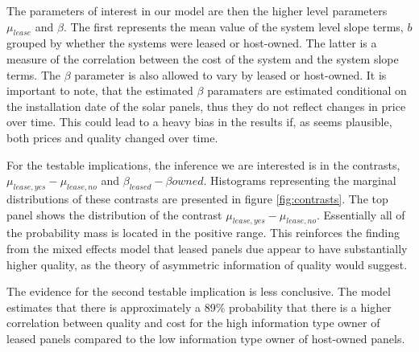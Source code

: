 \documentclass[12pt]{article}
\begin{document}
The parameters of interest in our model are then the higher level parameters $\mu_{lease}$ and $\beta$. The first represents the mean value of the system level slope terms, $b$ grouped by whether the systems were leased or host-owned. The latter is a measure of the correlation between the cost of the system and the system slope terms. The $\beta$ parameter is also allowed to vary by leased or host-owned. It is important to note, that the estimated $\beta$ paramaters are estimated conditional on the installation date of the solar panels, thus they do not reflect changes in price over time. This could lead to a heavy bias in the results if, as seems plausible, both prices and quality changed over time.

For the testable implications, the inference we are interested is in the contrasts, $\mu_{lease, yes} - \mu_{lease, no}$ and $\beta_{leased}- \beta{owned}$. Histograms representing the marginal distributions of these contrasts are presented in figure \ref{fig:contrasts}. The top panel shows the distribution of the contrast $\mu_{lease, yes} - \mu_{lease, no}$. Essentially all of the probability mass is located in the positive range. This reinforces the finding from the mixed effects model that leased panels due appear to have substantially higher quality, as the theory of asymmetric information of quality would suggest.

The evidence for the second testable implication is less conclusive. The model estimates that there is approximately a 89\% probability that there is a higher correlation between quality and cost for the high information type owner of leased panels compared to the low information type owner of host-owned panels.
\end{document}
